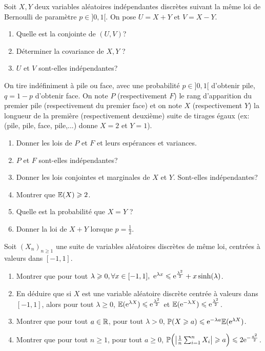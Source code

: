 \documentclass[12pt]{article}
\begin{document}
\begin{exercise}
	Soit $X,Y$ deux variables aléatoires indépendantes discrètes suivant la même
	loi de Bernoulli de paramètre $p\in]0,1[$. On pose $U=X+Y$ et $V=X-Y$.
	\begin{enumerate}
		\item
		Quelle est la conjointe de $(U,V)$?
		\item
		Déterminer la covariance de $X,Y$ ?
		\item
		$U$ et $V$ sont-elles indépendantes?
	\end{enumerate}
\end{exercise}

\begin{exercise}
	On tire indéfiniment à pile ou face, avec une probabilité $p\in]0,1[$
	d'obtenir pile, $q=1-p$ d'obtenir face. On note $P$ (respectivement $F$) le
	rang d'apparition du premier pile (respectivement du premier face) et on note
	$X$ (respectivement $Y$) la longueur de la première (respectivement deuxième)
	suite de tirages égaux (ex: (pile, pile, face, pile,...) donne $X=2$ et
	$Y=1$).
	\begin{enumerate}
		\item
		Donner les lois de $P$ et $F$ et leurs espérances et variances.
		\item
		$P$ et $F$ sont-elles indépendantes?
		\item
		Donner les lois conjointes et marginales de $X$ et $Y$. Sont-elles
		indépendantes?
		\item
		Montrer que $\mathbb{E}(X)\geqslant2$.
		\item
		Quelle est la probabilité que $X=Y$ ?
		\item
		Donner la loi de $X+Y$ lorsque $p=\frac{1}{2}$.
	\end{enumerate}
\end{exercise}

\begin{exercise}
	Soit $(X_{n})_{n\geqslant1}$ une suite de variables aléatoires discrètes de même loi, centrées à valeurs dans $[-1,1]$.
	\begin{enumerate}
		\item
		Montrer que pour tout $\lambda\geqslant0,\forall x\in[-1,1],~\mathrm{e}^{\lambda
		x}\leqslant \mathrm{e}^{\frac{\lambda^{2}}{2}}+x\sinh(\lambda)$.
		\item
		En déduire que si $X$ est une variable aléatoire discrète centrée à
		valeurs dans $[-1,1]$, alors pour tout $\lambda\geqslant0$, $\mathbb{E}(\mathrm{e}^{\lambda
		X})\leqslant \mathrm{e}^{\frac{\lambda^{2}}{2}}$ et $\mathbb{E}(\mathrm{e}^{-\lambda X})\leqslant
		\mathrm{e}^{\frac{\lambda^{2}}{2}}$.
		\item
		Montrer que pour tout $a\in\mathbb{R}$, pour tout $\lambda>0$, $\mathbb{P}(X\geqslant
		a)\leqslant \mathrm{e}^{-\lambda a}\mathbb{E}(\mathrm{e}^{\lambda X})$.
		\item
		Montrer que pour tout $n\geqslant1$, pour tout $a\geqslant0$,
		$\mathbb{P}\Bigl(\bigl\vert\frac{1}{n}\sum_{i=1}^{n}X_{i}\bigr\vert\geqslant
		a\Bigr)\leqslant2\mathrm{e}^{-\frac{a^{2}}{2}}$.
	\end{enumerate}
\end{exercise}
\end{document}
